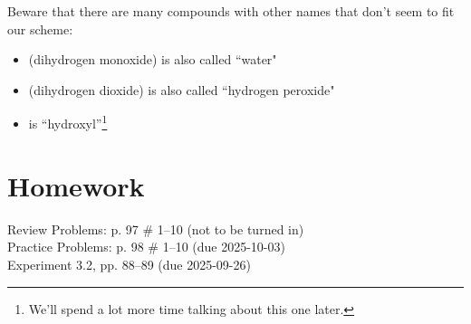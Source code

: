 \documentclass[11pt, oneside]{article}   	%
\begin{document}
Beware that there are many compounds with other names that don't seem to fit our scheme:
\begin{itemize}
\item {} (dihydrogen monoxide) is also called ``water"
\item {} (dihydrogen dioxide) is also called ``hydrogen peroxide"
\item {} is ``hydroxyl''\footnote{We'll spend a lot more time talking about this one later.}
\end{itemize}

\section{Homework}
Review Problems: p. 97 \# 1--10 (not to be turned in)\\
Practice Problems: p. 98 \# 1--10 (due 2025-10-03)\\
Experiment 3.2, pp. 88–89 (due 2025-09-26)\\


\nocite{wile-chem-2}
{}

\end{document}
